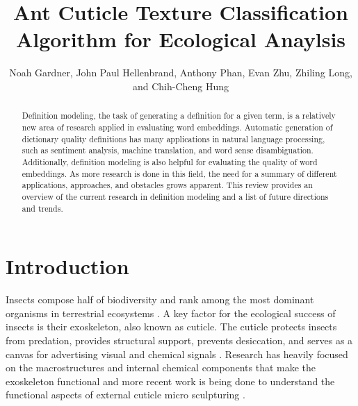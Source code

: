 \documentclass{aci}
\numberwithin{equation}{section}
\begin{document}
\title{Ant Cuticle Texture Classification Algorithm for Ecological Anaylsis}

\author{%
    Noah Gardner,
    John Paul Hellenbrand,
    Anthony Phan,
    Evan Zhu,
    Zhiling Long,
    and Chih-Cheng Hung\corrauth
}%


\address{%
}


\begin{abstract}
    Definition modeling, the task of generating a definition for a given term,
    is a relatively new area of research applied in evaluating word embeddings.
    Automatic generation of dictionary quality definitions has many applications
    in natural language processing, such as sentiment analysis, machine
    translation, and word sense disambiguation. Additionally, definition
    modeling is also helpful for evaluating the quality of word embeddings. As
    more research is done in this field, the need for a summary of different
    applications, approaches, and obstacles grows apparent. This review provides
    an overview of the current research in definition modeling and a list of
    future directions and trends.
\end{abstract}
\maketitle

\section{Introduction}
Insects compose half of biodiversity and rank among the most dominant organisms
in terrestrial ecosystems \cite{sheikh_diverse_2017}. A key factor for the
ecological success of insects is their exoskeleton, also known as cuticle. The
cuticle protects insects from predation, provides structural support, prevents
desiccation, and serves as a canvas for advertising visual and chemical signals
\cite{gullan_insects_2009}. Research has heavily focused on the macrostructures
and internal chemical components that make the exoskeleton functional and more
recent work is being done to understand the functional aspects of external
cuticle micro sculpturing \cite{muthukrishnan_insect_2020,
    gunderson_insect_1989, watson_diversity_2017}.
\end{document}
